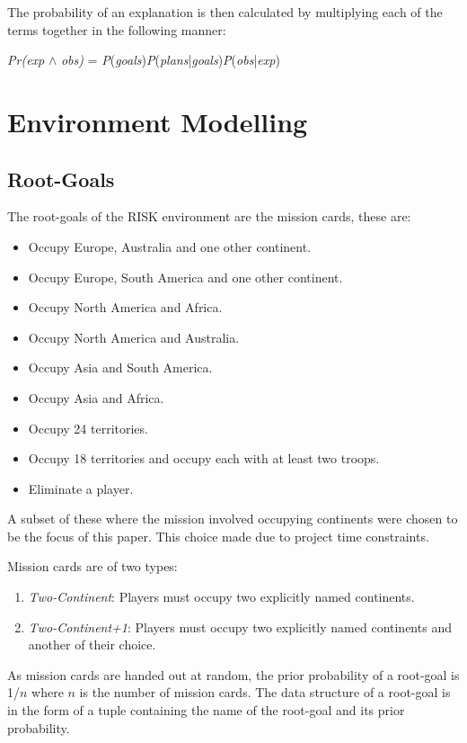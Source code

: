 \documentclass[parskip]{cs4rep}
\begin{document}
The probability of an explanation is then calculated by multiplying each of the terms together in the following manner: \newline

\centerline{
\textit{Pr(exp} $\wedge$ \textit{obs)} = \textit{P}(\textit{goals})\textit{P}(\textit{plans}|\textit{goals})\textit{P}(\textit{obs}|\textit{exp})
}

\section{Environment Modelling}

\subsection{Root-Goals}

The root-goals of the RISK environment are the mission cards, these are:

\begin{itemize}
\item
Occupy Europe, Australia and one other continent.
\item
Occupy Europe, South America and one other continent.
\item
Occupy North America and Africa.
\item
Occupy North America and Australia.
\item
Occupy Asia and South America.
\item
Occupy Asia and Africa.
\item
Occupy 24 territories.
\item
Occupy 18 territories and occupy each with at least two troops.
\item
Eliminate a player.
\end{itemize}

A subset of these where the mission involved occupying continents were chosen to be the focus of this paper. This choice made due to project time constraints. 

Mission cards are of two types:

\begin{enumerate}
\item
\textit{Two-Continent}: Players must occupy two explicitly named continents.
\item
\textit{Two-Continent+1}: Players must occupy two explicitly named continents and another of their choice.
\end{enumerate}

As mission cards are handed out at random, the prior probability of a root-goal is 1/$n$ where $n$ is the number of mission cards. The data structure of a root-goal is in the form of a tuple containing the name of the root-goal and its prior probability.
\end{document}
